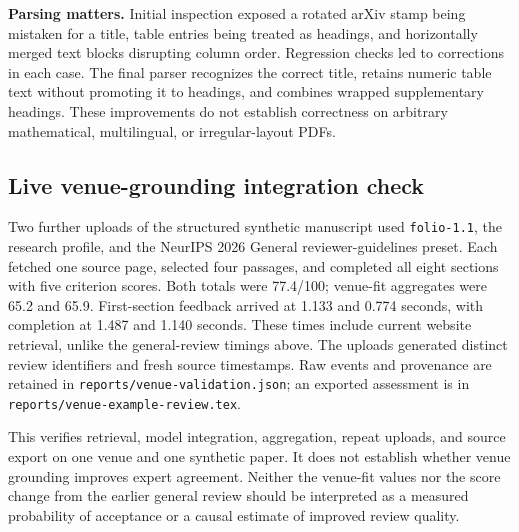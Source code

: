 \documentclass[11pt]{article}
\newcommand{\code}[1]{\texttt{#1}}
\begin{document}
\textbf{Parsing matters.} Initial inspection exposed a rotated arXiv stamp being mistaken for a title, table entries being treated as headings, and horizontally merged text blocks disrupting column order. Regression checks led to corrections in each case. The final parser recognizes the correct title, retains numeric table text without promoting it to headings, and combines wrapped supplementary headings. These improvements do not establish correctness on arbitrary mathematical, multilingual, or irregular-layout PDFs.

\subsection{Live venue-grounding integration check}
Two further uploads of the structured synthetic manuscript used \code{folio-1.1}, the research profile, and the NeurIPS 2026 General reviewer-guidelines preset. Each fetched one source page, selected four passages, and completed all eight sections with five criterion scores. Both totals were 77.4/100; venue-fit aggregates were 65.2 and 65.9. First-section feedback arrived at 1.133 and 0.774 seconds, with completion at 1.487 and 1.140 seconds. These times include current website retrieval, unlike the general-review timings above. The uploads generated distinct review identifiers and fresh source timestamps. Raw events and provenance are retained in \code{reports/venue-validation.json}; an exported assessment is in \code{reports/venue-example-review.tex}.

This verifies retrieval, model integration, aggregation, repeat uploads, and source export on one venue and one synthetic paper. It does not establish whether venue grounding improves expert agreement. Neither the venue-fit values nor the score change from the earlier general review should be interpreted as a measured probability of acceptance or a causal estimate of improved review quality.
\end{document}
